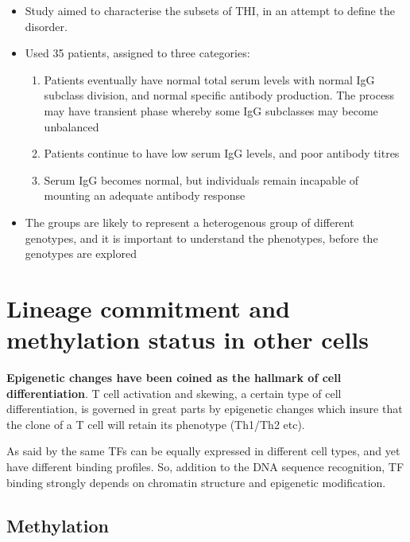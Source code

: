 \documentclass[12pt]{article}
\begin{document}
				\begin{itemize}
					\item Study aimed to characterise the subsets of THI, in an attempt to define the disorder. 
					\item Used 35 patients, assigned to three categories:
					\begin{enumerate}
						\item Patients eventually have normal total serum levels with normal IgG subclass division, and normal specific antibody production. The process may have transient phase whereby some IgG subclasses may become unbalanced 
						\item Patients continue to have low serum IgG levels, and poor antibody titres
						\item Serum IgG becomes normal, but individuals remain incapable of mounting an adequate antibody response
					\end{enumerate}
					\item The groups are likely to represent a heterogenous group of different genotypes, and it is important to understand the phenotypes, before the genotypes are explored
				\end{itemize}
			
	\section{Lineage commitment and methylation status in other cells}
	
		{\bf Epigenetic changes have been coined as the hallmark of cell differentiation}. T cell activation and skewing, a certain type of cell differentiation, is governed in great parts by epigenetic changes which insure that the clone of a T cell will retain its phenotype (Th1/Th2 etc).
		
		As said by \citet{Choukrallah14} the same TFs can be equally expressed in different cell types, and yet have different binding profiles. So, addition to the DNA sequence recognition, TF binding strongly depends on chromatin structure and epigenetic modification.
	
		\subsection{Methylation}
		
\end{document}
